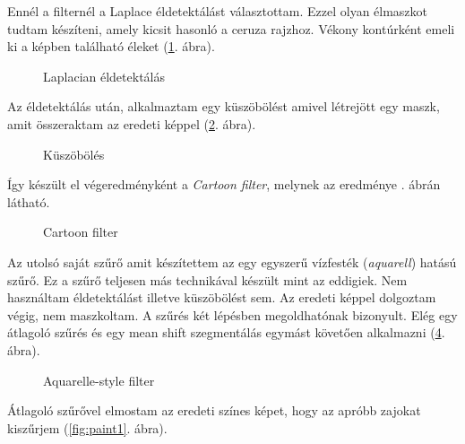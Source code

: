 
Ennél a filternél a Laplace éldetektálást választottam. Ezzel olyan élmaszkot tudtam készíteni, amely kicsit hasonló a ceruza rajzhoz. Vékony kontúrként emeli ki a képben található éleket (\ref{fig:2_cartoon3}. ábra).


\begin{figure}[ht]
\centering
{}
\caption{Laplacian éldetektálás} 
\label{fig:2_cartoon3}
\end{figure}


Az éldetektálás után, alkalmaztam egy küszöbölést amivel létrejött egy maszk, amit összeraktam az eredeti képpel (\ref{fig:2_cartoon4}. ábra).

\begin{figure}[ht]
\centering
{}
\caption{Küszöbölés} 
\label{fig:2_cartoon4}
\end{figure}

Így készült el végeredményként a \textit{Cartoon filter}, melynek az eredménye . ábrán látható.

\begin{figure}[ht]
\centering
{}
\caption{Cartoon filter} 
\label{fig:2_cartoon5}
\end{figure}


Az utolsó saját szűrő amit készítettem az egy egyszerű vízfesték (\textit{aquarell}) hatású szűrő. Ez a szűrő teljesen más technikával készült mint az eddigiek. Nem használtam éldetektálást illetve küszöbölést sem. Az eredeti képpel dolgoztam végig, nem maszkoltam. A szűrés két lépésben megoldhatónak bizonyult. Elég egy átlagoló szűrés és egy mean shift szegmentálás egymást követően alkalmazni (\ref{fig:paint}. ábra).

\begin{figure}[ht]
\centering
{}
\caption{Aquarelle-style filter} 
\label{fig:paint}
\end{figure}


Átlagoló szűrővel elmostam az eredeti színes képet, hogy az apróbb zajokat kiszűrjem (\ref{fig:paint1}. ábra).

